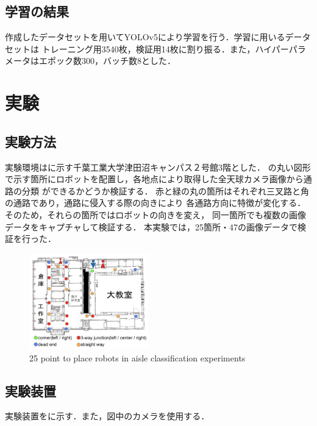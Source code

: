 \documentclass[10pt]{jarticle}
\begin{document}
     \subsection{学習の結果}
     作成したデータセットを用いてYOLOv5\cite{yolov5}により学習を行う．学習に用いるデータセットは
     トレーニング用3540枚，検証用14枚に割り振る．また，ハイパーパラメータはエポック数300，バッチ数8とした．

    \section{実\hspace{2zw}験}%
     \subsection{実験方法}
     実験環境はに示す千葉工業大学津田沼キャンパス２号館3階とした．
     の丸い図形で示す箇所にロボットを配置し，各地点により取得した全天球カメラ画像から通路の分類
     ができるかどうか検証する．
     赤と緑の丸の箇所はそれぞれ三叉路と角の通路であり，通路に侵入する際の向きにより
     各通路方向に特徴が変化する．そのため，それらの箇所ではロボットの向きを変え，
     同一箇所でも複数の画像データをキャプチャして検証する．
     本実験では，25箇所・47の画像データで検証を行った．

        \begin{figure}[!b]
            \includegraphics[width=0.46\textwidth]{./fig/new_experimental_point.png}
            \caption{25 point to place robots in aisle classification experiments}
            \label{fig:experiment_point}
        \end{figure}

     \subsection{実験装置}%
     実験装置をに示す．また，図中のカメラを使用する．
    
\end{document}
